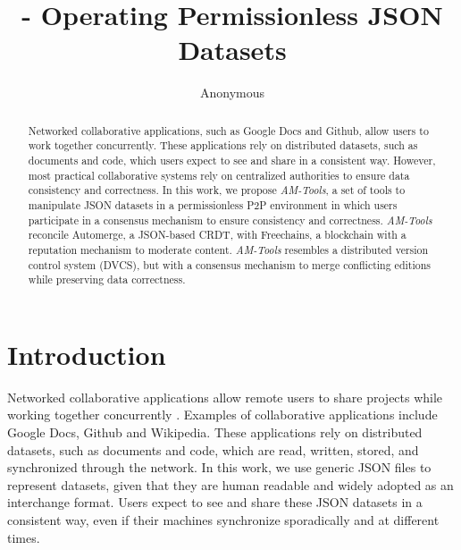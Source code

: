 \documentclass[12pt]{article}
\title{
    \AMT - Operating Permissionless JSON Datasets
}
\author{Anonymous}
\newcommand{\AMT}      {\emph{AM-Tools}\xspace}
\begin{document}

\maketitle

\begin{abstract}
Networked collaborative applications, such as Google Docs and Github, allow
users to work together concurrently.
These applications rely on distributed datasets, such as documents and code,
which users expect to see and share in a consistent way.
However, most practical collaborative systems rely on centralized authorities
to ensure data consistency and correctness.
%
In this work, we propose \AMT, a set of tools to manipulate JSON datasets in a
permissionless P2P environment in which users participate in a consensus
mechanism to ensure consistency and correctness.
%
\AMT reconcile Automerge, a JSON-based CRDT, with Freechains, a blockchain with
a reputation mechanism to moderate content.
%
\AMT resembles a distributed version control system (DVCS), but with a
consensus mechanism to merge conflicting editions while preserving data
correctness.
\end{abstract}

\section{Introduction}
\label{sec.introduction}

Networked collaborative applications allow remote users to share projects while
working together concurrently \cite{wu2010partial}.
Examples of collaborative applications include Google Docs, Github and
Wikipedia.
%
These applications rely on distributed datasets, such as documents and code,
which are read, written, stored, and synchronized through the network.
In this work, we use generic JSON files to represent datasets, given that they
are human readable and widely adopted as an interchange format.
Users expect to see and share these JSON datasets in a consistent way, even if
their machines synchronize sporadically and at different times.
\end{document}
